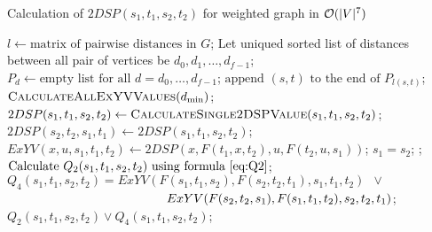\begin{algorithm}
\caption{Calculation of $2DSP(s_1, t_1, s_2, t_2)$ for weighted graph in $\mathcal{O}(|V|^7)$} \label{alg:n7w}
\begin{algorithmic}[1]
\State $l \gets \text{matrix of pairwise distances in }G$;
\State Let uniqued sorted list of distances between all pair of vertices be $d_0, d_1, \ldots, d_{f-1}$;
\State $P_d \gets \text{empty list for all }d = d_0, \ldots, d_{f-1}$;
    \State $\text{append }(s, t)\text{ to the end of }P_{l(s, t)}$;
\EndFor
{}
    \State $\textsc{CalculateAllExYVValues}(d_{\min})$; \label{line:calcExYVw}
                \State $2DSP(s_1, t_1, s_2, t_2) \gets \textsc{CalculateSingle2DSPValue}(s_1, t_1, s_2, t_2)$;
                \State $2DSP(s_2, t_2, s_1, t_1) \gets 2DSP(s_1, t_1, s_2, t_2)$; 
            \EndFor
        \EndFor
    \EndFor
\EndFor
\EndProcedure
\Statex
{}
                \State $ExYV(x,u,s_1,t_1,t_2) \gets 2DSP(x, F(t_1,x,t_2), u, F(t_2,u,s_1))$;
            \EndFor
        \EndFor
    \EndFor
\EndProcedure
\Statex
{}
    \State \Return $s_1 = s_2$; 
    \State {};
\Else
    \State $\text{Calculate }Q_2(s_1, t_1, s_2, t_2)\text{ using formula \eqref{eq:Q2}}$; 
    \State $Q_4(s_1, t_1, s_2, t_2) = ExYV(F(s_1, t_1, s_2), F(s_2, t_2, t_1), s_1, t_1, t_2)\enspace\vee\enspace$ 
    \Statex $\hspace{4.5cm}ExYV(F(s_2, t_2, s_1), F(s_1, t_1, t_2), s_2, t_2, t_1)$; \label{line:useExYV}
    \State \Return $Q_2(s_1, t_1, s_2, t_2) \vee Q_4(s_1, t_1, s_2, t_2)$;
\EndIf
\EndProcedure
\end{algorithmic}
\end{algorithm}

